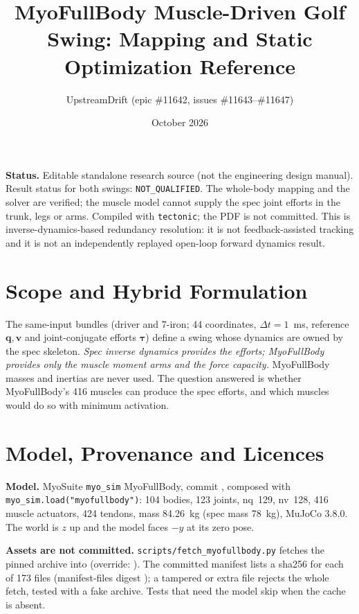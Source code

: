 \documentclass[11pt,a4paper]{article}
\title{MyoFullBody Muscle-Driven Golf Swing: Mapping and Static Optimization Reference}
\author{UpstreamDrift (epic \#11642, issues \#11643--\#11647)}
\date{October 2026}
\begin{document}
\maketitle

\noindent\textbf{Status.} Editable standalone research source (not the engineering design manual). Result status for both swings: \texttt{NOT\_QUALIFIED}. The whole-body mapping and the solver are verified; the muscle model cannot supply the spec joint efforts in the trunk, legs or arms. Compiled with \texttt{tectonic}; the PDF is not committed. This is inverse-dynamics-based redundancy resolution: it is not feedback-assisted tracking and it is not an independently replayed open-loop forward dynamics result.

\section{Scope and Hybrid Formulation}
The same-input bundles (driver and 7-iron; 44 coordinates, $\Delta t=1$~ms, reference $\mathbf{q},\mathbf{v}$ and joint-conjugate efforts $\boldsymbol\tau$) define a swing whose dynamics are owned by the spec skeleton. \emph{Spec inverse dynamics provides the efforts; MyoFullBody provides only the muscle moment arms and the force capacity.} MyoFullBody masses and inertias are never used. The question answered is whether MyoFullBody's 416 muscles can produce the spec efforts, and which muscles would do so with minimum activation.

\section{Model, Provenance and Licences}
\textbf{Model.} MyoSuite \texttt{myo\_sim} MyoFullBody, commit , composed with \texttt{myo\_sim.load("myofullbody")}: 104 bodies, 123 joints, nq~129, nv~128, 416 muscle actuators, 424 tendons, mass 84.26~kg (spec mass 78~kg), MuJoCo 3.8.0. The world is $z$ up and the model faces $-y$ at its zero pose.

\textbf{Assets are not committed.} \texttt{scripts/fetch\_myofullbody.py} fetches the pinned archive into  (override: ). The committed manifest lists a sha256 for each of 173 files (manifest-files digest ); a tampered or extra file rejects the whole fetch, tested with a fake archive. Tests that need the model skip when the cache is absent.
\end{document}
